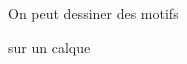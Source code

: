 \documentclass[preview]{standalone}
\begin{document}
\begin{center}
On peut dessiner des motifs
        
sur un calque
\end{center}
\end{document}
